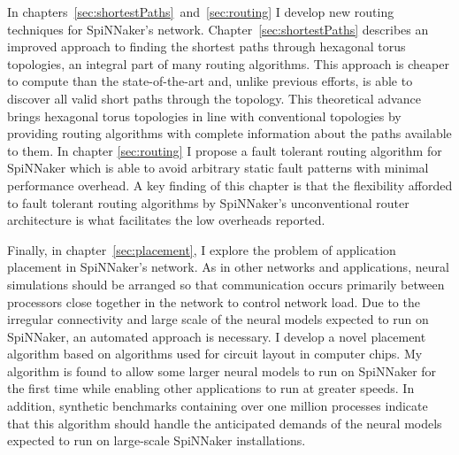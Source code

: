In chapters~\ref{sec:shortestPaths}~and~\ref{sec:routing} I develop new routing
techniques for SpiNNaker's network. Chapter~\ref{sec:shortestPaths} describes
an improved approach to finding the shortest paths through hexagonal torus
topologies, an integral part of many routing algorithms. This approach is
cheaper to compute than the state-of-the-art and, unlike previous efforts, is
able to discover all valid short paths through the topology. This theoretical
advance brings hexagonal torus topologies in line with conventional topologies
by providing routing algorithms with complete information about the paths
available to them. In chapter \ref{sec:routing} I propose a fault tolerant
routing algorithm for SpiNNaker which is able to avoid arbitrary static fault
patterns with minimal performance overhead. A key finding of this chapter is
that the flexibility afforded to fault tolerant routing algorithms by
SpiNNaker's unconventional router architecture is what facilitates the low
overheads reported.

Finally, in chapter~\ref{sec:placement}, I explore the problem of application
placement in SpiNNaker's network. As in other networks and applications, neural
simulations should be arranged so that communication occurs primarily between
processors close together in the network to control network load. Due to the
irregular connectivity and large scale of the neural models expected to run on
SpiNNaker, an automated approach is necessary. I develop a novel placement
algorithm based on algorithms used for circuit layout in computer chips. My
algorithm is found to allow some larger neural models to run on SpiNNaker for
the first time while enabling other applications to run at greater speeds. In
addition, synthetic benchmarks containing over one million processes indicate
that this algorithm should handle the anticipated demands of the neural models
expected to run on large-scale SpiNNaker installations.

